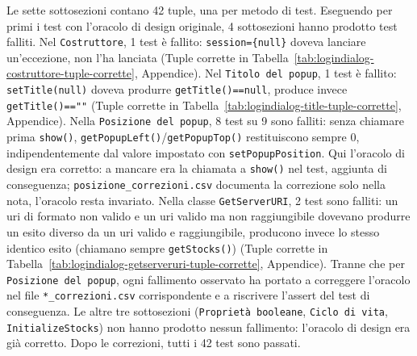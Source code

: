 Le sette sottosezioni contano 42 tuple, una per metodo di test. Eseguendo per primi i test con
l'oracolo di design originale, 4 sottosezioni hanno prodotto test falliti. Nel
\texttt{Costruttore}, 1 test è fallito: \texttt{session=\{null\}} doveva lanciare un'eccezione,
non l'ha lanciata (Tuple corrette in Tabella~\ref{tab:logindialog-costruttore-tuple-corrette},
Appendice). Nel \texttt{Titolo del popup}, 1 test è fallito: \texttt{setTitle(null)}
doveva produrre \texttt{getTitle()==null}, produce invece \texttt{getTitle()==""} (Tuple corrette
in Tabella~\ref{tab:logindialog-title-tuple-corrette}, Appendice). Nella
\texttt{Posizione del popup}, 8 test su 9 sono falliti: senza chiamare prima \texttt{show()},
\texttt{getPopupLeft()}/\texttt{getPopupTop()} restituiscono sempre $0$, indipendentemente dal
valore impostato con \texttt{setPopupPosition}. Qui l'oracolo di design era corretto: a mancare
era la chiamata a \texttt{show()} nel test, aggiunta di conseguenza; \texttt{posizione\_correzioni.csv}
documenta la correzione solo nella nota, l'oracolo resta invariato. Nella classe
\texttt{GetServerURI}, 2 test sono falliti: un uri di formato non valido e un uri valido ma non
raggiungibile dovevano produrre un esito diverso da un uri valido e raggiungibile, producono
invece lo stesso identico esito (chiamano sempre \texttt{getStocks()}) (Tuple corrette in
Tabella~\ref{tab:logindialog-getserveruri-tuple-corrette}, Appendice). Tranne che per
\texttt{Posizione del popup}, ogni fallimento osservato ha portato a correggere l'oracolo nel
file \texttt{*\_correzioni.csv} corrispondente e a riscrivere l'assert del test di conseguenza.
Le altre tre sottosezioni (\texttt{Proprietà
booleane}, \texttt{Ciclo di vita}, \texttt{InitializeStocks}) non hanno prodotto nessun
fallimento: l'oracolo di design era già corretto. Dopo le correzioni, tutti i 42 test sono
passati.
